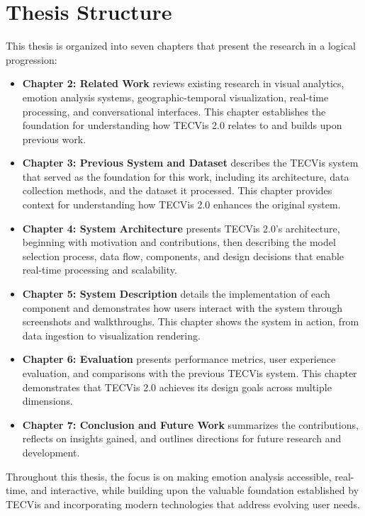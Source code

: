 
\section{Thesis Structure}

This thesis is organized into seven chapters that present the research in a logical progression:

\begin{itemize}
\item \textbf{Chapter 2: Related Work} reviews existing research in visual analytics, emotion analysis systems, geographic-temporal visualization, real-time processing, and conversational interfaces. This chapter establishes the foundation for understanding how TECVis 2.0 relates to and builds upon previous work.

\item \textbf{Chapter 3: Previous System and Dataset} describes the TECVis system that served as the foundation for this work, including its architecture, data collection methods, and the dataset it processed. This chapter provides context for understanding how TECVis 2.0 enhances the original system.

\item \textbf{Chapter 4: System Architecture} presents TECVis 2.0's architecture, beginning with motivation and contributions, then describing the model selection process, data flow, components, and design decisions that enable real-time processing and scalability.

\item \textbf{Chapter 5: System Description} details the implementation of each component and demonstrates how users interact with the system through screenshots and walkthroughs. This chapter shows the system in action, from data ingestion to visualization rendering.

\item \textbf{Chapter 6: Evaluation} presents performance metrics, user experience evaluation, and comparisons with the previous TECVis system. This chapter demonstrates that TECVis 2.0 achieves its design goals across multiple dimensions.

\item \textbf{Chapter 7: Conclusion and Future Work} summarizes the contributions, reflects on insights gained, and outlines directions for future research and development.
\end{itemize}

Throughout this thesis, the focus is on making emotion analysis accessible, real-time, and interactive, while building upon the valuable foundation established by TECVis and incorporating modern technologies that address evolving user needs.


\let\cleardoublepage\clearpage

